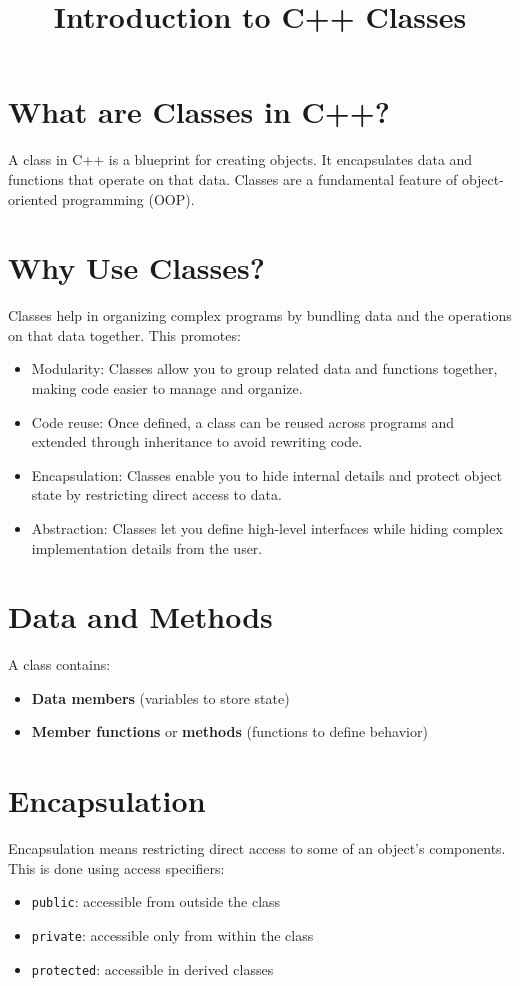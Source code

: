 \documentclass{article}
\title{Introduction to C++ Classes}
\author{}
\date{}
\begin{document}
\maketitle

\section{What are Classes in C++?}
A class in C++ is a blueprint for creating objects. It encapsulates data and functions that operate on that data. Classes are a fundamental feature of object-oriented programming (OOP).

\section{Why Use Classes?}
Classes help in organizing complex programs by bundling data and the operations on that data together. This promotes:
\begin{itemize}
    \item Modularity: Classes allow you to group related data and functions together, making code easier to manage and organize.
	\item Code reuse: Once defined, a class can be reused across programs and extended through inheritance to avoid rewriting code.
	\item Encapsulation: Classes enable you to hide internal details and protect object state by restricting direct access to data.
	\item Abstraction: Classes let you define high-level interfaces while hiding complex implementation details from the user.
\end{itemize}

\section{Data and Methods}
A class contains:
\begin{itemize}
  \item \textbf{Data members} (variables to store state)
  \item \textbf{Member functions} or \textbf{methods} (functions to define behavior)
\end{itemize}

\section{Encapsulation}
Encapsulation means restricting direct access to some of an object's components. This is done using access specifiers:
\begin{itemize}
  \item \texttt{public}: accessible from outside the class
  \item \texttt{private}: accessible only from within the class
  \item \texttt{protected}: accessible in derived classes
\end{itemize}
\end{document}
